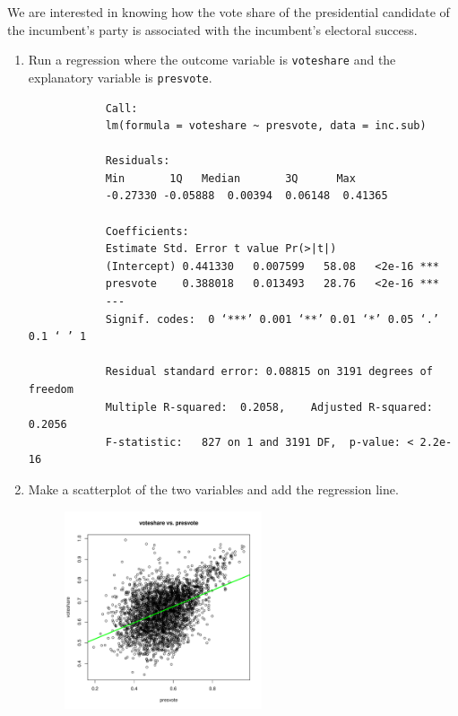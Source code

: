 \documentclass[12pt,letterpaper]{article}
\begin{document}
\noindent We are interested in knowing how the vote share of the presidential candidate of the incumbent's party is associated with the incumbent's electoral success.
	\vspace{.25cm}
	\begin{enumerate}
	
	
	
		\item Run a regression where the outcome variable is \texttt{voteshare} and the explanatory variable is \texttt{presvote}.
			\vspace{.25cm}
			  
			\begin{verbatim}
			Call:
			lm(formula = voteshare ~ presvote, data = inc.sub)
			
			Residuals:
			Min       1Q   Median       3Q      Max 
			-0.27330 -0.05888  0.00394  0.06148  0.41365 
			
			Coefficients:
			Estimate Std. Error t value Pr(>|t|)    
			(Intercept) 0.441330   0.007599   58.08   <2e-16 ***
			presvote    0.388018   0.013493   28.76   <2e-16 ***
			---
			Signif. codes:  0 ‘***’ 0.001 ‘**’ 0.01 ‘*’ 0.05 ‘.’ 0.1 ‘ ’ 1
			
			Residual standard error: 0.08815 on 3191 degrees of freedom
			Multiple R-squared:  0.2058,	Adjusted R-squared:  0.2056 
			F-statistic:   827 on 1 and 3191 DF,  p-value: < 2.2e-16
			\end{verbatim}
			\vspace{2cm}
	
	
				\newpage	
	
	
		\item Make a scatterplot of the two variables and add the regression line. 
				\begin{figure}[h!]
				\centering
				\includegraphics[width=0.55\textwidth]{plot_question3.pdf}
				\end{figure}
				\vspace{1cm}
	

\end{enumerate}
\end{document}
